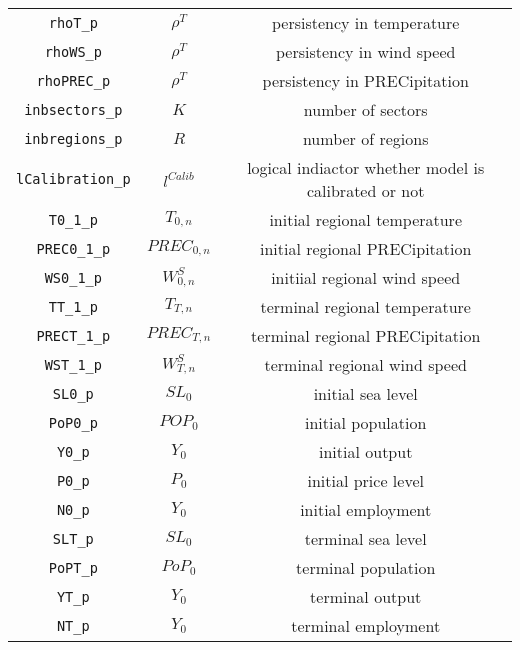 \begin{center}
\begin{longtable}{ccc}
\texttt{rhoT\_p} & ${\rho^{T}}$ & persistency in temperature\\
\texttt{rhoWS\_p} & ${\rho^{T}}$ & persistency in wind speed\\
\texttt{rhoPREC\_p} & ${\rho^{T}}$ & persistency in PRECipitation\\
\texttt{inbsectors\_p} & ${K}$ & number of sectors\\
\texttt{inbregions\_p} & ${R}$ & number of regions\\
\texttt{lCalibration\_p} & ${l^{Calib}}$ & logical indiactor whether model is calibrated or not\\
\texttt{T0\_1\_p} & ${T_{0,n}}$ & initial regional temperature\\
\texttt{PREC0\_1\_p} & ${PREC_{0,n}}$ & initial regional PRECipitation\\
\texttt{WS0\_1\_p} & ${W^{S}_{0,n}}$ & initiial regional wind speed\\
\texttt{TT\_1\_p} & ${T_{T,n}}$ & terminal regional temperature\\
\texttt{PRECT\_1\_p} & ${PREC_{T,n}}$ & terminal regional PRECipitation\\
\texttt{WST\_1\_p} & ${W^{S}_{T,n}}$ & terminal regional wind speed\\
\texttt{SL0\_p} & ${SL_0}$ & initial sea level\\
\texttt{PoP0\_p} & ${POP_0}$ & initial population\\
\texttt{Y0\_p} & ${Y_0}$ & initial output\\
\texttt{P0\_p} & ${P_0}$ & initial price level\\
\texttt{N0\_p} & ${Y_0}$ & initial employment\\
\texttt{SLT\_p} & ${SL_0}$ & terminal sea level\\
\texttt{PoPT\_p} & ${PoP_0}$ & terminal population\\
\texttt{YT\_p} & ${Y_0}$ & terminal output\\
\texttt{NT\_p} & ${Y_0}$ & terminal employment\\
\hline%
\end{longtable}
\end{center}
